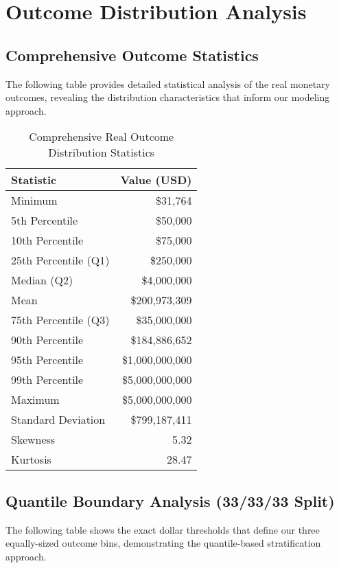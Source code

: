\documentclass[11pt]{article}
\begin{document}
\section{Outcome Distribution Analysis}

\subsection{Comprehensive Outcome Statistics}

The following table provides detailed statistical analysis of the real monetary outcomes, revealing the distribution characteristics that inform our modeling approach.

\begin{table}[H]
\centering
\caption{Comprehensive Real Outcome Distribution Statistics}
\begin{tabular}{lr}
\toprule
\textbf{Statistic} & \textbf{Value (USD)} \\
\midrule
Minimum & \$31,764 \\
5th Percentile & \$50,000 \\
10th Percentile & \$75,000 \\
25th Percentile (Q1) & \$250,000 \\
Median (Q2) & \$4,000,000 \\
Mean & \$200,973,309 \\
75th Percentile (Q3) & \$35,000,000 \\
90th Percentile & \$184,886,652 \\
95th Percentile & \$1,000,000,000 \\
99th Percentile & \$5,000,000,000 \\
Maximum & \$5,000,000,000 \\
\midrule
Standard Deviation & \$799,187,411 \\
Skewness & 5.32 \\
Kurtosis & 28.47 \\
\bottomrule
\end{tabular}
\end{table}

\subsection{Quantile Boundary Analysis (33/33/33 Split)}

The following table shows the exact dollar thresholds that define our three equally-sized outcome bins, demonstrating the quantile-based stratification approach.
\end{document}
